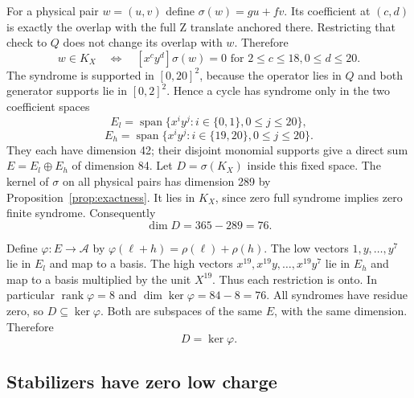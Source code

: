 \documentclass{article}
\DeclareMathOperator{\rank}{rank}
\DeclareMathOperator{\Span}{span}
\begin{document}
For a physical pair \(w=(u,v)\) define
\(\sigma(w)=gu+fv\). Its coefficient at \((c,d)\) is exactly the overlap
with the full Z translate anchored there. Restricting that check to \(Q\)
does not change its overlap with \(w\). Therefore
\begin{equation}
  w\in K_X \quad\Longleftrightarrow\quad
  [x^cy^d]\sigma(w)=0
  \text{ for } 2\le c\le 18, 0\le d\le 20.
\end{equation}
The syndrome is supported in \([0,20]^2\), because the operator lies in
\(Q\) and both generator supports lie in \([0,2]^2\).
Hence a cycle has syndrome only in the two coefficient spaces
\begin{equation}
  E_l=\Span\{x^iy^j:i\in\{0,1\}, 0\le j\le 20\},
\end{equation}
\begin{equation}
  E_h=\Span\{x^iy^j:i\in\{19,20\}, 0\le j\le 20\}.
\end{equation}
They each have dimension 42; their disjoint monomial supports give a
direct sum \(E=E_l\oplus E_h\) of dimension 84.
Let \(D=\sigma(K_X)\) inside this fixed space.
The kernel of \(\sigma\) on all physical pairs has dimension 289 by
Proposition~\ref{prop:exactness}. It lies in \(K_X\), since zero full syndrome
implies zero finite syndrome. Consequently
\begin{equation}
  \dim D=365-289=76.
\end{equation}

Define \(\varphi\colon E\to\mathcal{A}\) by
\(\varphi(\ell+h)=\rho(\ell)+\rho(h)\).
The low vectors \(1,y,\dots,y^7\) lie in \(E_l\) and map to a basis.
The high vectors \(x^{19},x^{19}y,\dots,x^{19}y^7\) lie in \(E_h\) and
map to a basis multiplied by the unit \(X^{19}\). Thus each restriction
is onto. In particular \(\rank\varphi=8\) and \(\dim\ker\varphi=84-8=76\).
All syndromes have residue zero, so \(D\subseteq\ker\varphi\).
Both are subspaces of the same \(E\), with the same dimension. Therefore
\begin{equation}
  D=\ker\varphi.
\end{equation}

\subsection{Stabilizers have zero low charge}\label{sec:x-stabilizers}
\end{document}
